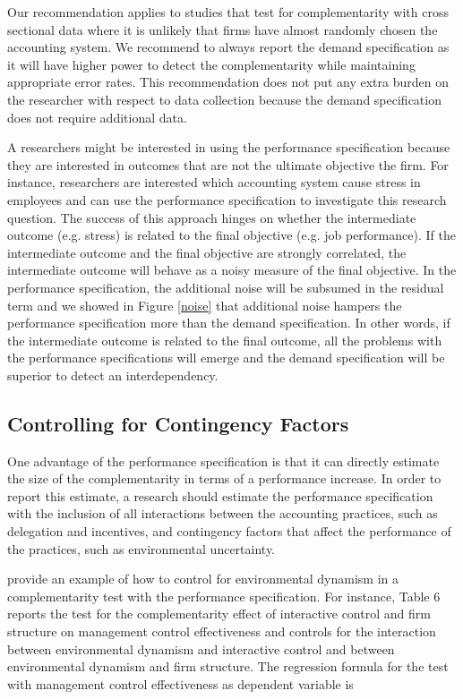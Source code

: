 \documentclass[12pt]{article}
\begin{document}
Our recommendation applies to studies that test for complementarity with cross sectional data where it is unlikely that firms have almost randomly chosen the accounting system. We recommend to always report the demand specification as it will have higher power to detect the complementarity while maintaining appropriate error rates. This recommendation does not put any extra burden on the researcher with respect to data collection because the demand specification does not require additional data.

A researchers might be interested in using the performance specification because they are interested in outcomes that are not the ultimate objective the firm. For instance, researchers are interested which accounting system cause stress in employees \citep{shields_design_2000} and can use the performance specification to investigate this research question. The success of this approach hinges on whether the intermediate outcome (e.g. stress) is related to the final objective (e.g. job performance). If the intermediate outcome and the final objective are strongly correlated, the intermediate outcome will behave as a noisy measure of the final objective. In the performance specification, the additional noise will be subsumed in the residual term and we showed in Figure \ref{noise} that additional noise hampers the performance specification more than the demand specification. In other words, if the intermediate outcome is related to the final outcome, all the problems with the performance specifications will emerge and the demand specification will be superior to detect an interdependency.

\subsection{Controlling for Contingency Factors}

One advantage of the performance specification is that it can directly estimate the size of the complementarity in terms of a performance increase. In order to report this estimate, a research should estimate the performance specification with the inclusion of all interactions between the accounting practices, such as delegation and incentives, and contingency factors that affect the performance of the practices, such as environmental uncertainty. 

\citet{bedford_management_2016} provide an example of how to control for environmental dynamism in a complementarity test with the performance specification. For instance, Table 6 reports the test for the complementarity effect of interactive control and firm structure on management control effectiveness and controls for the interaction between environmental dynamism and interactive control and between environmental dynamism and firm structure. The regression formula for the test with management control effectiveness as dependent variable is 
\end{document}
